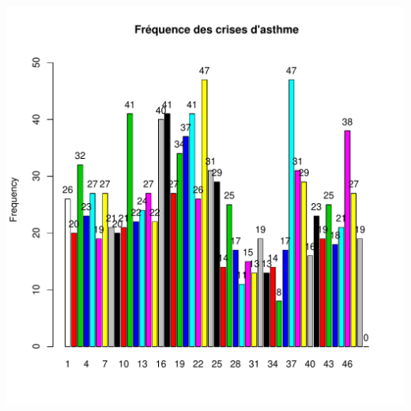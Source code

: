 \documentclass[12pt,english,french,twoside]{report}\usepackage[]{graphicx}\usepackage[]{color}
\makeatletter
\def\maxwidth{ %
  \ifdim\Gin@nat@width>\linewidth
    \linewidth
  \else
    \Gin@nat@width
  \fi
}
\makeatother
\begin{document}
\includegraphics[width=\maxwidth]{figure/asthme22} 
\end{document}
